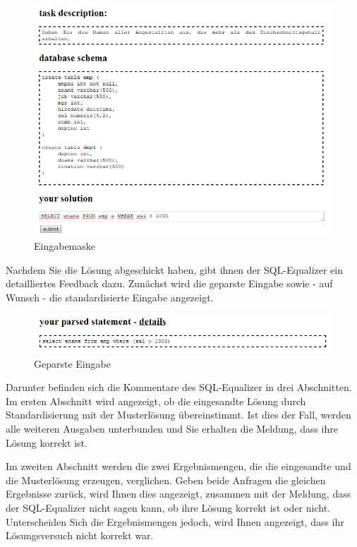 \documentclass[12pt]{scrreprt}
\theoremstyle{remark}
\begin{document}
\begin{figure}[h]
\centering
\includegraphics[scale=0.6]{Bilder/screen_user_4.png}
\caption{Eingabemaske}
\label{fig:maske1}
\end{figure}


Nachdem Sie die Lösung abgeschickt haben, gibt ihnen der SQL-Equalizer ein detailliertes Feedback dazu. Zunächst wird die geparste Eingabe sowie - auf Wunsch - die standardisierte Eingabe angezeigt.

\begin{figure}[H]
\centering
\includegraphics[scale=0.6]{Bilder/screen_user_5.png}
\caption{Geparste Eingabe}
\end{figure}

Darunter befinden sich die Kommentare des SQL-Equalizer in drei Abschnitten. Im ersten Abschnitt wird angezeigt, ob die eingesandte Lösung durch Standardisierung mit der Musterlösung übereinstimmt. Ist dies der Fall, werden alle weiteren Ausgaben unterbunden und Sie erhalten die Meldung, dass ihre Lösung korrekt ist.

Im zweiten Abschnitt werden die zwei Ergebnismengen, die die eingesandte und die Musterlösung erzeugen, verglichen. Geben beide Anfragen die gleichen Ergebnisse zurück, wird Ihnen dies angezeigt, zusammen mit der Meldung, dass der SQL-Equalizer nicht sagen kann, ob ihre Lösung korrekt ist oder nicht. Unterscheiden Sich die Ergebnismengen jedoch, wird Ihnen angezeigt, dass ihr Lösungsversuch nicht korrekt war.
\end{document}
